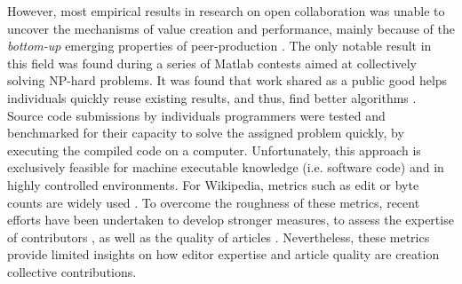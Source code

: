 However, most empirical results in research on open collaboration was unable to uncover the mechanisms of value creation and performance, mainly because of the {\it bottom-up} emerging properties of peer-production \cite{benkler2002}.  The only notable result in this field was found during a series of Matlab contests aimed at collectively solving NP-hard problems. It was found that work shared as a public good helps individuals quickly reuse existing results, and thus, find better algorithms \cite{gulley2010}. Source code submissions by individuals programmers were tested and benchmarked for their capacity to solve the assigned problem quickly, by executing the compiled code on a computer. Unfortunately, this approach is exclusively feasible for machine executable knowledge (i.e. software code) and in highly controlled environments. For Wikipedia, metrics such as edit or byte counts are widely used \cite{burke2008taking}.  To overcome the roughness of these metrics, recent efforts have been undertaken to develop stronger measures, to assess the expertise of contributors \cite{geiger2013}, as well as the quality of articles \cite{wang2013tell}. Nevertheless, these metrics provide limited insights on how editor expertise and article quality are creation collective contributions.
